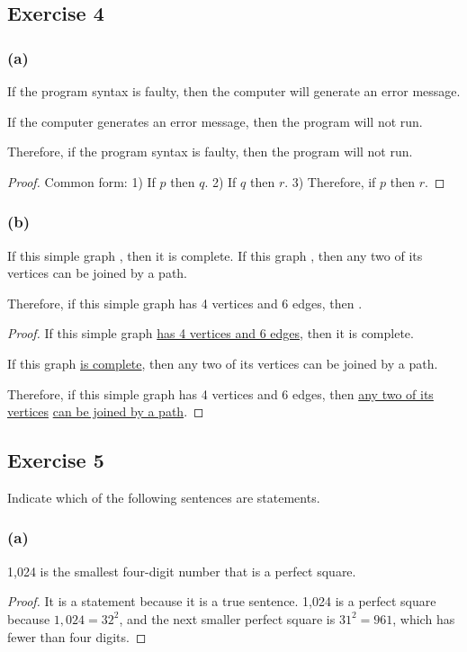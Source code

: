 \documentclass[14pt]{extarticle}
\begin{document}
\subsection{Exercise 4} \subsubsection{(a)} If the program syntax is faulty,
then the computer will generate an error message.

If the computer generates an error message, then the program will not run.

Therefore, if the program syntax is faulty, then the program will not run.

\begin{proof} Common form: 1) If $p$ then $q$. 2) If $q$ then $r$. 3) Therefore,
if $p$ then $r$. \end{proof}

\subsubsection{(b)} If this simple graph \fbl, then it is complete.
If this graph \fbl, then any two of its vertices can be joined by a path.

Therefore, if this simple graph has 4 vertices and 6 edges, then \fbl.

\begin{proof} If this simple graph \underline{has 4 vertices and 6 edges}, then
it is complete.

If this graph \underline{is complete}, then any two of its vertices can be
joined by a path.

Therefore, if this simple graph has 4 vertices and 6 edges, then \underline{any
two of its vertices} \underline{can be joined by a path}. \end{proof}

\subsection{Exercise 5} Indicate which of the following sentences are
statements.

\subsubsection{(a)} 1,024 is the smallest four-digit number that is a perfect
square.

\begin{proof} It is a statement because it is a true sentence. 1,024 is a
perfect square because $1,024 = 32^2$, and the next smaller perfect square is
$31^2 = 961$, which has fewer than four digits. \end{proof}
\end{document}
